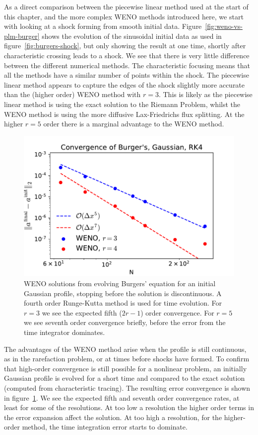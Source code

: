 As a direct comparison between the piecewise linear method used at the start of
this chapter, and the more complex WENO methods introduced here, we start with
looking at a shock forming from smooth initial data. Figure~\ref{fig:weno-vs-plm-burger}
shows the evolution of the sinusoidal initial data as used in figure~\ref{fig:burgers-shock},
but only showing the result at one time, shortly after characteristic crossing
leads to a shock. We see that there is very little difference between the
different numerical methods. The characteristic focusing means that all the
methods have a similar number of points within the shock. The piecewise linear
method appears to capture the edges of the shock slightly more accurate than the
(higher order) WENO method with $r=3$. This is likely as the piecewise linear
method is using the exact solution to the Riemann Problem, whilst the WENO method
is using the more diffusive Lax-Friedrichs flux splitting. At the higher $r=5$
order there is a marginal advantage to the WENO method.

\begin{figure}[t]
\centering
\includegraphics[width=0.8\linewidth]{weno-converge-burgers}
\caption[WENO convergence rates for Burgers' equation]
{\label{fig:weno-converge-burgers} WENO solutions from evolving Burgers'
equation for an initial Gaussian profile, stopping before the solution is
discontinuous. A fourth order Runge-Kutta method is used for time evolution.
For $r=3$ we see the expected fifth ($2 r - 1$) order convergence.
For $r=5$ we see seventh order convergence briefly, before the error from the
time integrator dominates. \\
}
\end{figure}
%

The advantages of the WENO method arise when the profile is still continuous, as
in the rarefaction problem, or at times before shocks have formed. To confirm
that high-order convergence is still possible for a nonlinear problem, an
initially Gaussian profile is evolved for a short time and compared to the
exact solution (computed from characteristic tracing). The resulting error
convergence is shown in figure~\ref{fig:weno-converge-burgers}. We see the
expected fifth and seventh order convergence rates, at least for some of the
resolutions. At too low a resolution the higher order terms in the error
expansion affect the solution. At too high a resolution, for the higher-order
method, the time integration error starts to dominate.
